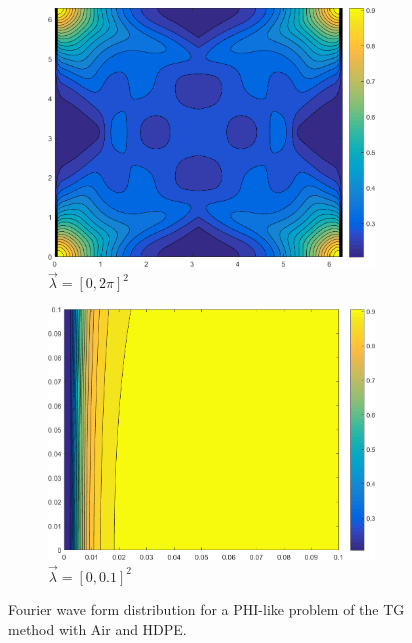 \begin{figure}
\centering
{
	\begin{subfigure}[b]{0.73\textwidth}
		\centering
		\includegraphics[width=0.95\textwidth]{figures/sec_DSA/MOD_PHI_FULL.png}
		\caption{$\vec{\lambda} = [0,2 \pi]^2$}
	\end{subfigure}
}
	\vspace{1cm}
{
	\begin{subfigure}[b]{0.75\textwidth}
		\centering
		\includegraphics[width=0.95\textwidth]{figures/sec_DSA/MOD_PHI_Zoom=01.png}
		\caption{$\vec{\lambda} = [0,0.1]^2$}
	\end{subfigure}
}
\caption{Fourier wave form distribution for a PHI-like problem of the TG method with Air and HDPE.}
\label{fig::IM1_TG_PHI}
\end{figure}



